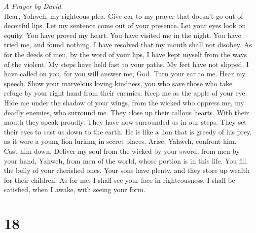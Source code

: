 \emph{A Prayer by David.}\\
 Hear, Yahweh, my righteous plea. Give ear to my prayer
that doesn't go out of deceitful lips.  Let my sentence
come out of your presence. Let your eyes look on equity. 
You have proved my heart. You have visited me in the night. You have
tried me, and found nothing. I have resolved that my mouth shall not
disobey.  As for the deeds of men, by the word of your
lips, I have kept myself from the ways of the violent.  My
steps have held fast to your paths. My feet have not slipped.
 I have called on you, for you will answer me, God. Turn
your ear to me. Hear my speech.  Show your marvelous
loving kindness, you who save those who take refuge by your right hand
from their enemies.  Keep me as the apple of your eye.
Hide me under the shadow of your wings,  from the wicked
who oppress me, my deadly enemies, who surround me.  They
close up their callous hearts. With their mouth they speak proudly.
 They have now surrounded us in our steps. They set their
eyes to cast us down to the earth.  He is like a lion
that is greedy of his prey, as it were a young lion lurking in secret
places.  Arise, Yahweh, confront him. Cast him down.
Deliver my soul from the wicked by your sword,  from men
by your hand, Yahweh, from men of the world, whose portion is in this
life. You fill the belly of your cherished ones. Your sons have plenty,
and they store up wealth for their children.  As for me,
I shall see your face in righteousness. I shall be satisfied, when I
awake, with seeing your form.

\hypertarget{section-17}{%
\section{18}\label{section-17}}

